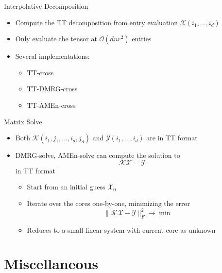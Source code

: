 \documentclass[aspectratio=169]{beamer}
\newcommand{\Tns}[1]{\mathcal{#1}}
\newcommand{\Ord}{\mathcal{O}}
\begin{document}
\begin{frame}{Interpolative Decomposition}
  \begin{itemize}
    \item
      Compute the TT decomposition from entry evaluation $\Tns{X}(i_1, \ldots,
      i_d)$
    \item
      Only evaluate the tensor at $\Ord(d n r^2)$ entries
    \item
      Several implementations:
      \begin{itemize}
        \item
          TT-cross
        \item
          TT-DMRG-cross
        \item
          TT-AMEn-cross
      \end{itemize}
  \end{itemize}
\end{frame}

\begin{frame}{Matrix Solve}
  \begin{itemize}
    \item
      Both $\Tns{K}(i_1, j_1, \ldots, i_d, j_d)$ and $\Tns{Y}(i_1, \ldots, i_d)$
      are in TT format
    \item
      DMRG-solve, AMEn-solve can compute the solution to
      \begin{equation*}
        \Tns{K} \Tns{X} = \Tns{Y}
      \end{equation*}
      in TT format
      \begin{itemize}
        \item
          Start from an initial guess $\Tns{X}_0$
        \item
          Iterate over the cores one-by-one, minimizing the error
          \begin{equation*}
            \lVert \Tns{K} \Tns{X} - \Tns{Y} \rVert_F^2 \to \min
          \end{equation*}
        \item
          Reduces to a small linear system with current core as unknown
      \end{itemize}
  \end{itemize}
\end{frame}

\section{Miscellaneous}
\end{document}
